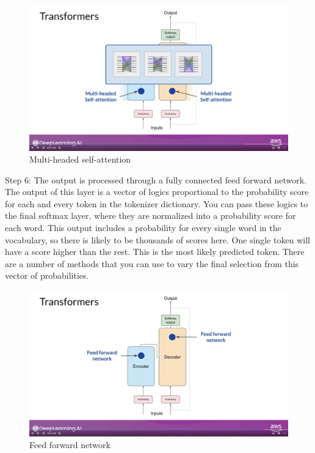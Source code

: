 \documentclass[12pt]{report}
\begin{document}
\begin{figure}[H]
  \centering
  \caption{Multi-headed self-attention}
  \includegraphics[trim=3cm 7cm 5cm 0cm,clip,scale=0.15]{pics/multiheaded.png}
\end{figure}

Step 6: The output is processed through a fully connected feed forward network. The output of this layer is a vector of logics proportional to the probability score for each and every token in the tokenizer dictionary. You can pass these logics to the final softmax layer, where  they are normalized into a probability score for each word. This output includes a probability for every single word in the vocabulary, so there is likely to be thousands of scores here. One single token will have a score higher than the rest. This is the most likely predicted token. There are a number of methods that you can use to vary the final selection from this vector of probabilities.


\begin{figure}[H]
  \centering
  \caption{Feed forward network}
  \includegraphics[trim=3cm 7cm 5cm 0cm,clip,scale=0.15]{pics/feed.png}
\end{figure}
\end{document}
